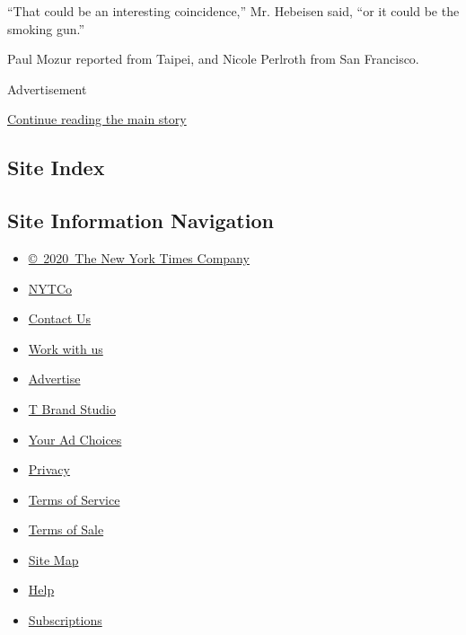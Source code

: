 ``That could be an interesting coincidence,'' Mr. Hebeisen said, ``or it
could be the smoking gun.''

Paul Mozur reported from Taipei, and Nicole Perlroth from San Francisco.

Advertisement

\protect\hyperlink{after-bottom}{Continue reading the main story}

\hypertarget{site-index}{%
\subsection{Site Index}\label{site-index}}

\hypertarget{site-information-navigation}{%
\subsection{Site Information
Navigation}\label{site-information-navigation}}

\begin{itemize}
\tightlist
\item
  \href{https://help.nytimes.com/hc/en-us/articles/115014792127-Copyright-notice}{©~2020~The
  New York Times Company}
\end{itemize}

\begin{itemize}
\tightlist
\item
  \href{https://www.nytco.com/}{NYTCo}
\item
  \href{https://help.nytimes.com/hc/en-us/articles/115015385887-Contact-Us}{Contact
  Us}
\item
  \href{https://www.nytco.com/careers/}{Work with us}
\item
  \href{https://nytmediakit.com/}{Advertise}
\item
  \href{http://www.tbrandstudio.com/}{T Brand Studio}
\item
  \href{https://www.nytimes.com/privacy/cookie-policy\#how-do-i-manage-trackers}{Your
  Ad Choices}
\item
  \href{https://www.nytimes.com/privacy}{Privacy}
\item
  \href{https://help.nytimes.com/hc/en-us/articles/115014893428-Terms-of-service}{Terms
  of Service}
\item
  \href{https://help.nytimes.com/hc/en-us/articles/115014893968-Terms-of-sale}{Terms
  of Sale}
\item
  \href{https://spiderbites.nytimes.com}{Site Map}
\item
  \href{https://help.nytimes.com/hc/en-us}{Help}
\item
  \href{https://www.nytimes.com/subscription?campaignId=37WXW}{Subscriptions}
\end{itemize}
